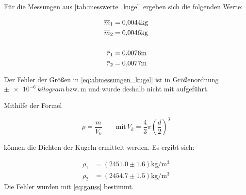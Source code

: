 Für die Messungen aus \ref{tab:messwerte_kugel} ergeben sich die
folgenden Werte:

\begin{align} %
\label{eq:abmessungen_kugel}
\begin{aligned}
\overline{m}_{1}&=  \num{0.0044}\si{\kilogram} \\
\overline{m}_{2}&= \num{0.0046} \si{\kilogram} \\
\hfill \\
\overline{r}_{1}&= \num{0.0076}\si{\meter} \\
\overline{r}_{2}&= \num{0.0077} \si{\meter} \\
\end{aligned}
\end{align}

Der Fehler der Größen in \eqref{eq:abmessungen_kugel} ist in Größenordnung $\pm \SI{e-6}{kilogram}\,\text{bzw.}\, \si{\meter}$
und wurde deshalb nicht mit aufgeführt.

Mithilfe der Formel%

\begin{equation*}
\rho=\frac{m}{V_{k}} \qquad \text{mit} \, V_{k}=\frac{4}{3}\pi \left(\frac{d}{2}\right)^3
\end{equation*}

können die Dichten der Kugeln ermittelt werden.
Es ergibt sich:

\begin{align*}
\rho_{1}&=\left(\num{2451.0}\pm\num{1.6}\right) \si{\kilogram\per\cubic\meter}\\
\rho_{2}&=\left(\num{2454.7}\pm\num{1.5}\right) \si{\kilogram\per\cubic\meter}
\end{align*}
Die Fehler wurden mit \eqref{eq:gauss} bestimmt.
